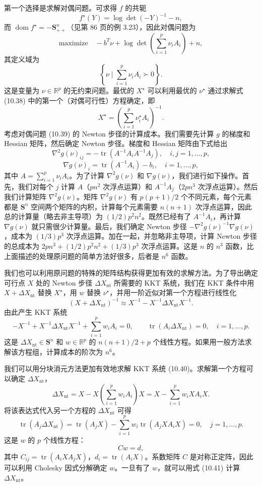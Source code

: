 \documentclass[UTF8, 12pt, fontset=fandol, oneside]{ctexart}
\begin{document}
第一个选择是求解对偶问题。可求得 $f$ 的共轭
\[
f^\star(Y)=\log\det(-Y)^{-1}-n,
\]
而 $\operatorname{dom} f^\star=-\mathbf{S}_{++}^n$（见第 86 页的例 3.23），因此对偶问题为
\begin{equation}
\mbox{maximize}\quad -b^T\nu+\log\det\left(\sum_{i=1}^p\nu_iA_i\right)+n,
\tag{10.39}
\end{equation}
其定义域为
\[
\left\{\nu\mid \sum_{i=1}^p\nu_iA_i\succ0\right\}.
\]
这是变量为 $\nu\in\mathbb{R}^p$ 的无约束问题。最优的 $X^\star$ 可以利用最优的 $\nu^\star$ 通过求解式 (10.38) 中的第一个（对偶可行性）方程确定，即
\[
X^\star=\left(\sum_{i=1}^p\nu_i^\star A_i\right)^{-1}.
\]
考虑对偶问题 (10.39) 的 Newton 步径的计算成本。我们需要先计算 $g$ 的梯度和 Hessian 矩阵，然后确定 Newton 步径。梯度和 Hessian 矩阵由下式给出
\[
\nabla^2g(\nu)_{ij}=-\operatorname{tr}(A^{-1}A_iA^{-1}A_j),\quad i,j=1,\ldots,p,
\]
\[
\nabla g(\nu)_i=\operatorname{tr}(A^{-1}A_i)-b_i,\quad i=1,\ldots,p,
\]
其中 $A=\sum_{i=1}^p\nu_iA_i$。为了计算 $\nabla^2g(\nu)$ 和 $\nabla g(\nu)$，我们进行如下操作。首先，我们对每个 $j$ 计算 $A$（$pn^2$ 次浮点运算）和 $A^{-1}A_j$（$2pn^3$ 次浮点运算）。然后我们计算矩阵 $\nabla^2g(\nu)$。矩阵 $\nabla^2g(\nu)$ 有 $p(p+1)/2$ 个不同元素，每个元素都是 $\mathbf{S}^n$ 空间两个矩阵的内积，计算每个元素需要 $n(n+1)$ 次浮点运算，因此总的计算量（略去非主导项）为 $(1/2)p^2n^2$。既然已经有了 $A^{-1}A_i$，再计算 $\nabla g(\nu)$ 就只需很少计算量。最后，我们确定 Newton 步径 $-\nabla^2g(\nu)^{-1}\nabla g(\nu)$，成本为 $(1/3)p^3$ 次浮点运算。加在一起，并忽略非主导项，计算 Newton 步径的总成本为 $2pn^3+(1/2)p^2n^2+(1/3)p^3$ 次浮点运算。这是 $n$ 的 $n^3$ 函数，比上面描述的处理原问题的简单方法好很多，后者是 $n^6$ 函数。

我们也可以利用原问题的特殊的矩阵结构获得更加有效的求解方法。为了导出确定可行点 $X$ 处的 Newton 步径 $\Delta X_{\mathrm{nt}}$ 所需要的 KKT 系统，我们在 KKT 条件中用 $X+\Delta X_{\mathrm{nt}}$ 替换 $X^\star$，用 $w$ 替换 $\nu^\star$，并用一阶近似对第一个方程进行线性化
\[
(X+\Delta X_{\mathrm{nt}})^{-1}\approx X^{-1}-X^{-1}\Delta X_{\mathrm{nt}}X^{-1}.
\]
由此产生 KKT 系统
\begin{equation}
-X^{-1}+X^{-1}\Delta X_{\mathrm{nt}}X^{-1}
+\sum_{i=1}^p w_iA_i=0,\qquad
\operatorname{tr}(A_i\Delta X_{\mathrm{nt}})=0,\quad i=1,\ldots,p.
\tag{10.40}
\end{equation}
这是 $\Delta X_{\mathrm{nt}}\in\mathbf{S}^n$ 和 $w\in\mathbb{R}^p$ 的 $n(n+1)/2+p$ 个线性方程。如果用一般方法求解该方程组，计算成本的阶次为 $n^6$。

我们可以用分块消元方法更加有效地求解 KKT 系统 (10.40)。求解第一个方程可以确定 $\Delta X_{\mathrm{nt}}$，
\begin{equation}
\Delta X_{\mathrm{nt}}
=X-X\left(\sum_{i=1}^p w_iA_i\right)X
=X-\sum_{i=1}^p w_iXA_iX.
\tag{10.41}
\end{equation}
将该表达式代入另一个方程的 $\Delta X_{\mathrm{nt}}$ 可得
\[
\operatorname{tr}(A_j\Delta X_{\mathrm{nt}})
=\operatorname{tr}(A_jX)-\sum_{i=1}^p w_i\operatorname{tr}(A_jXA_iX)=0,\quad j=1,\ldots,p.
\]
这是 $w$ 的 $p$ 个线性方程：
\[
Cw=d,
\]
其中 $C_{ij}=\operatorname{tr}(A_iXA_jX)$，$d_i=\operatorname{tr}(A_iX)$。系数矩阵 $C$ 是对称正定阵，因此可以利用 Cholesky 因式分解确定 $w$。一旦有了 $w$，就可以用式 (10.41) 计算 $\Delta X_{\mathrm{nt}}$。
\end{document}
